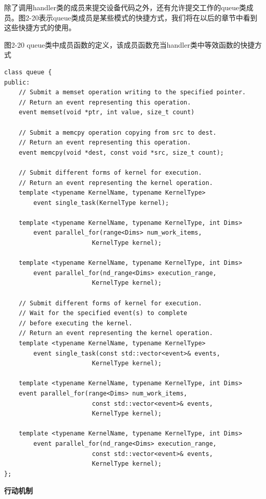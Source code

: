 除了调用handler类的成员来提交设备代码之外，还有允许提交工作的queue类成员。图2-20表示queue类成员是某些模式的快捷方式，我们将在以后的章节中看到这些快捷方式的使用。\par

\hspace*{\fill} \par %
图2-20 queue类中成员函数的定义，该成员函数充当handler类中等效函数的快捷方式
\begin{lstlisting}[caption={}]
class queue {
public:
	// Submit a memset operation writing to the specified pointer.
	// Return an event representing this operation.
	event memset(void *ptr, int value, size_t count)
	
	// Submit a memcpy operation copying from src to dest.
	// Return an event representing this operation.
	event memcpy(void *dest, const void *src, size_t count);
	
	// Submit different forms of kernel for execution.
	// Return an event representing the kernel operation.
	template <typename KernelName, typename KernelType>
		event single_task(KernelType kernel);
		
	template <typename KernelName, typename KernelType, int Dims>
		event parallel_for(range<Dims> num_work_items, 
						KernelType kernel); 
						
	template <typename KernelName, typename KernelType, int Dims>
		event parallel_for(nd_range<Dims> execution_range, 
						KernelType kernel); 
						
	// Submit different forms of kernel for execution. 
	// Wait for the specified event(s) to complete 
	// before executing the kernel. 
	// Return an event representing the kernel operation.
	template <typename KernelName, typename KernelType>
		event single_task(const std::vector<event>& events, 
						KernelType kernel);
						
	template <typename KernelName, typename KernelType, int Dims>
	event parallel_for(range<Dims> num_work_items, 
						const std::vector<event>& events, 
						KernelType kernel);
	
	template <typename KernelName, typename KernelType, int Dims>
		event parallel_for(nd_range<Dims> execution_range, 
						const std::vector<event>& events, 
						KernelType kernel);
};
\end{lstlisting}

\hspace*{\fill} \par %
\textbf{行动机制}

